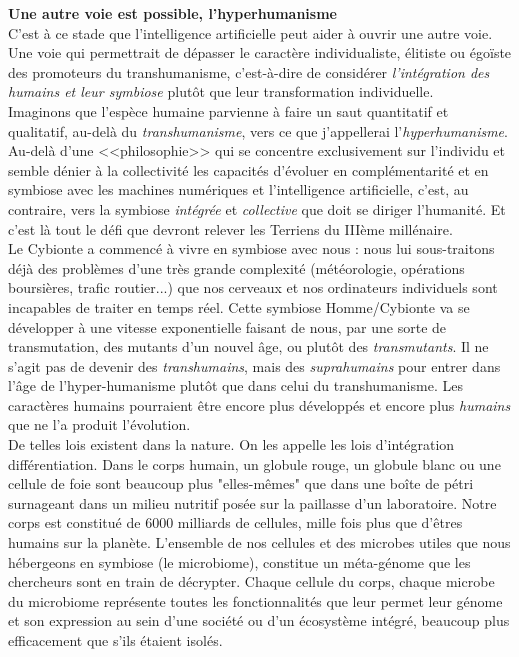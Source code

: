 \documentclass[11pt,twoside,a4paper]{article}
\begin{document}
\textbf{Une autre voie est possible, l'hyperhumanisme}~\\

C'est {\`a} ce stade que l'intelligence artificielle peut aider {\`a} ouvrir une autre voie. Une voie qui permettrait de d{\'e}passer le caract{\`e}re individualiste, {\'e}litiste ou {\'e}go{\"i}ste des promoteurs du transhumanisme, c'est-{\`a}-dire de consid{\'e}rer \emph{l'int{\'e}gration des humains et leur symbiose} plut{\^o}t que leur transformation individuelle. ~\\

Imaginons que l'esp{\`e}ce humaine parvienne {\`a} faire un saut quantitatif et qualitatif, au-del{\`a} du \emph{transhumanisme}, vers ce que j'appellerai l'\emph{hyperhumanisme}. Au-del{\`a} d'une <<philosophie>> qui se concentre exclusivement sur l'individu et semble d{\'e}nier {\`a} la collectivit{\'e} les capacit{\'e}s d'{\'e}voluer en compl{\'e}mentarit{\'e} et en symbiose avec les machines num{\'e}riques et l'intelligence artificielle, c'est, au contraire, vers la symbiose \emph{int{\'e}gr{\'e}e} et \emph{collective} que doit se diriger l'humanit{\'e}. Et c'est l{\`a} tout le d{\'e}fi que devront relever les Terriens du III{\`e}me mill{\'e}naire. ~\\

Le Cybionte a commenc{\'e} {\`a} vivre en symbiose avec nous : nous lui sous-traitons d{\'e}j{\`a} des probl{\`e}mes d'une tr{\`e}s grande complexit{\'e} (m{\'e}t{\'e}orologie, op{\'e}rations boursi{\`e}res, trafic routier...) que nos cerveaux et nos ordinateurs individuels sont incapables de traiter en temps r{\'e}el. Cette symbiose Homme/Cybionte va se d{\'e}velopper {\`a} une vitesse exponentielle faisant de nous, par une sorte de transmutation, des mutants d'un nouvel {\^a}ge, ou plut{\^o}t des \emph{transmutants}. Il ne s'agit pas de devenir des \emph{transhumains}, mais des \emph{suprahumains} pour entrer dans l'{\^a}ge de l'hyper-humanisme plut{\^o}t que dans celui du transhumanisme. Les caract{\`e}res humains pourraient {\^e}tre encore plus d{\'e}velopp{\'e}s et encore plus \emph{humains} que ne l'a produit l'{\'e}volution. ~\\

De telles lois existent dans la nature. On les appelle les lois d'int{\'e}gration diff{\'e}rentiation. Dans le corps humain, un globule rouge, un globule blanc ou une cellule de foie sont beaucoup plus "elles-m{\^e}mes" que dans une bo{\^i}te de p{\'e}tri surnageant dans un milieu nutritif pos{\'e}e sur la paillasse d'un laboratoire. Notre corps est constitu{\'e} de 6000 milliards de cellules, mille fois plus que d'{\^e}tres humains sur la plan{\`e}te. L'ensemble de nos cellules et des microbes utiles que nous h{\'e}bergeons en symbiose (le microbiome), constitue un m{\'e}ta-g{\'e}nome que les chercheurs sont en train de d{\'e}crypter. Chaque cellule du corps, chaque microbe du microbiome repr{\'e}sente toutes les fonctionnalit{\'e}s que leur permet leur g{\'e}nome et son expression au sein d'une soci{\'e}t{\'e} ou d'un {\'e}cosyst{\`e}me int{\'e}gr{\'e}, beaucoup plus efficacement que s'ils {\'e}taient isol{\'e}s. ~\\
\end{document}
